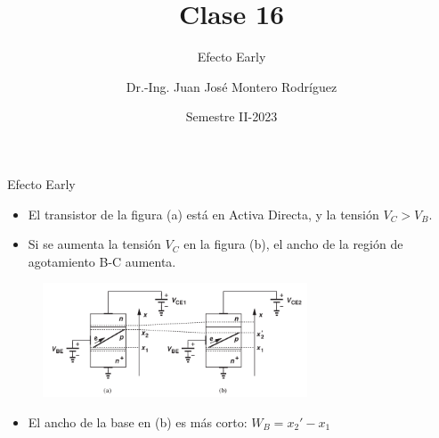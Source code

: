 \documentclass[t,aspectratio=169]{beamer}
\title{Clase 16}
\subtitle{Efecto Early}
\author{Dr.-Ing. Juan José Montero Rodríguez}
\institute{Escuela de Ingeniería Electrónica}
\date{Semestre II-2023}
\begin{document}
\begin{frame}{}
\maketitle
\end{frame}



\begin{frame}{Efecto Early}

\begin{itemize}
    \item El transistor de la figura (a) está en Activa Directa, y la tensión $V_C > V_B$.
    \item Si se aumenta la tensión $V_C$ en la figura (b), el ancho de la región de agotamiento B-C aumenta.
\end{itemize}

\begin{figure}[H]
    \centering
    \includegraphics[width=0.7\textwidth]{figuras/efecto_early_sentido_fisico.png}
\end{figure}

\begin{itemize}
    \item El ancho de la base en (b) es más corto: $W_B = x_2' - x_1$
\end{itemize}

\end{frame}
\end{document}
